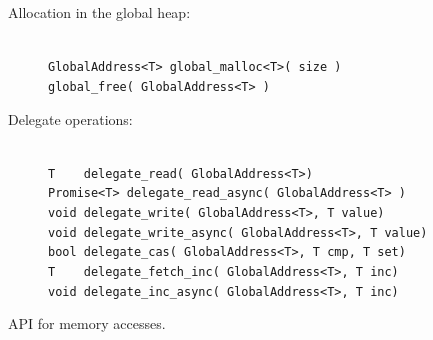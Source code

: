 \begin{figure}[htbp]
  \begin{center}
    \begin{minipage}{0.95\columnwidth}
	\small
  \begin{description}
    \item[Allocation in the global heap:] \hfill \\
      	\lstinline[style=grappa]{GlobalAddress<T> global_malloc<T>( size )} \hfill \\
      	\lstinline[style=grappa]{global_free( GlobalAddress<T> )}  \hfill
    \item[Delegate operations:] \hfill \\
      	\lstinline|T    delegate_read( GlobalAddress<T>)|  \hfill \\
      	\lstinline|Promise<T> delegate_read_async( GlobalAddress<T> )|  \hfill \\
      	\lstinline|void delegate_write( GlobalAddress<T>, T value)| \hfill \\
      	\lstinline|void delegate_write_async( GlobalAddress<T>, T value)| \hfill \\
      	\lstinline|bool delegate_cas( GlobalAddress<T>, T cmp, T set)| \hfill \\
      	\lstinline|T    delegate_fetch_inc( GlobalAddress<T>, T inc)| \hfill \\
      	\lstinline|void delegate_inc_async( GlobalAddress<T>, T inc)|  \hfill\\ 
	\end{description}
      \caption{\label{fig:accessing-memory} \Grappa API for memory accesses.}     \end{minipage}
  \end{center}
\end{figure}

